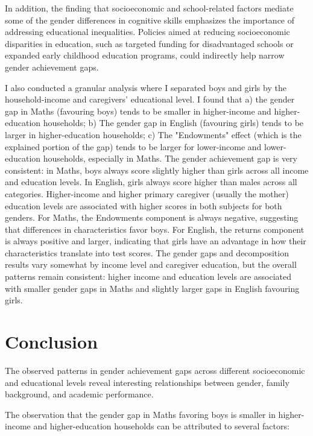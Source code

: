 \documentclass[12pt,a4paper,onecolumn]{article}
\numberwithin{equation}{section}
\begin{document}
In addition, the finding that socioeconomic and school-related factors mediate some of the gender differences in cognitive skills emphasizes the importance of addressing educational inequalities. Policies aimed at reducing socioeconomic disparities in education, such as targeted funding for disadvantaged schools or expanded early childhood education programs, could indirectly help narrow gender achievement gaps.

I also conducted a granular analysis where I separated boys and girls by the household-income and caregivers' educational level. I found that a) the gender gap in Maths (favouring boys) tends to be smaller in higher-income and higher-education households; b) The gender gap in English (favouring girls) tends to be larger in higher-education households; c) The "Endowments" effect (which is the explained portion of the gap) tends to be larger for lower-income and lower-education households, especially in Maths. The gender achievement gap is very consistent: in Maths, boys always score slightly higher than girls across all income and education levels. In English, girls always score higher than males across all categories. Higher-income and higher primary caregiver (usually the mother) education levels are associated with higher scores in both subjects for both genders. For Maths, the Endowments component is always negative, suggesting that differences in characteristics favor boys. For English, the returns component is always positive and larger, indicating that girls have an advantage in how their characteristics translate into test scores. The gender gaps and decomposition results vary somewhat by income level and caregiver education, but the overall patterns remain consistent: higher income and education levels are associated with smaller gender gaps in Maths and slightly larger gaps in English favouring girls.

\section{Conclusion}

The observed patterns in gender achievement gaps across different socioeconomic and educational levels reveal interesting relationships between gender, family background, and academic performance. 

The observation that the gender gap in Maths favoring boys is smaller in higher-income and higher-education households can be attributed to several factors:
\end{document}
